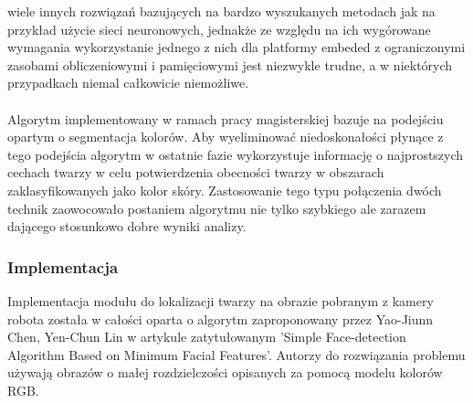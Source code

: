 wiele innych rozwiązań bazujących na bardzo wyszukanych metodach jak na przykład
użycie sieci neuronowych, jednakże ze względu na ich wygórowane wymagania
wykorzystanie jednego z nich dla platformy embeded z ograniczonymi zasobami
obliczeniowymi i pamięciowymi jest niezwykle trudne, a w niektórych przypadkach
niemal całkowicie niemożliwe.\\
\\
Algorytm implementowany w ramach pracy magisterskiej bazuje na podejściu opartym
o segmentacja kolorów. Aby wyeliminować niedoskonałości płynące z tego podejścia
algorytm w ostatnie fazie wykorzystuje informację o najprostszych cechach twarzy
w celu potwierdzenia obecności twarzy w obszarach zaklasyfikowanych jako kolor
skóry. Zastosowanie tego typu połączenia dwóch technik zaowocowało postaniem
algorytmu nie tylko szybkiego ale zarazem dającego stosunkowo dobre wyniki
analizy.
 


\subsubsection{Implementacja}
Implementacja modułu do lokalizacji twarzy na obrazie pobranym z kamery robota
została w całości oparta o algorytm zaproponowany przez Yao-Jiunn Chen, Yen-Chun
Lin w artykule zatytułowanym 'Simple Face-detection Algorithm Based on Minimum
Facial Features'. Autorzy do rozwiązania problemu używają obrazów o małej
rozdzielczości opisanych za pomocą modelu kolorów RGB. 

